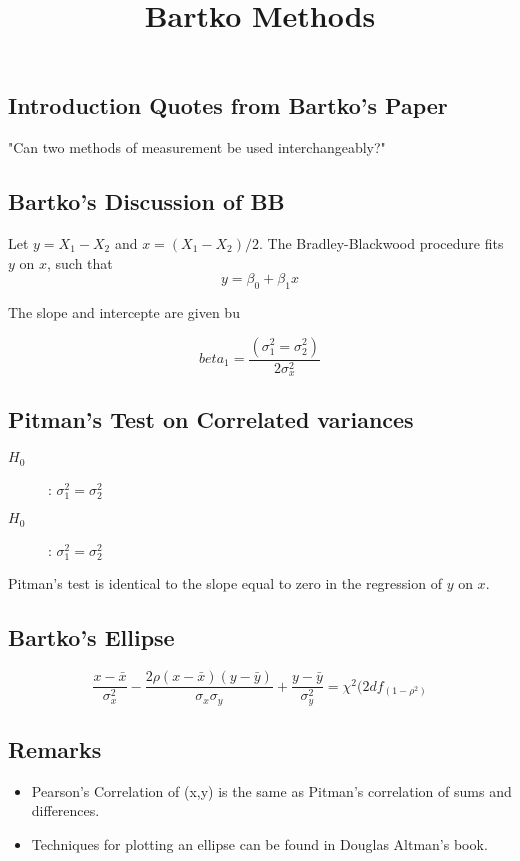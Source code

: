 

\title{Bartko Methods}
\subsection*{Introduction Quotes from Bartko's Paper}
"Can two methods of measurement be used interchangeably?"


\subsection*{Bartko's Discussion of BB}

Let $y = X_1 - X_2$ and $x= (X_1 - X_2)/2$.
The Bradley-Blackwood procedure fits $y$ on $x$, such that
\[ y = \beta_0 + \beta_1x \]

The slope and intercepte are given bu

\[beta_1 =  \frac{(\sigma^2_1 = \sigma^2_2)}{2\sigma^2_x}\]
\subsection*{Pitman's Test on Correlated variances}
\begin{description}
\item[$H_0$] : $\sigma^2_1 = \sigma^2_2$
\item[$H_0$] : $\sigma^2_1 = \sigma^2_2$
\end{description}


Pitman's test is identical to the slope equal to zero in the regression of $y$ on $x$.


\subsection*{Bartko's Ellipse}

\[ \frac{x - \bar{x}}{\sigma^2_x} - \frac{2\rho(x - \bar{x})(y - \bar{y})}{\sigma_x \sigma_y} + \frac{y - \bar{y}}{\sigma^2_y} = \chi^2(2df_(1-\rho^2) \]

\subsection*{Remarks}
\begin{itemize}
\item Pearson's Correlation of (x,y) is the same as Pitman's correlation of sums and differences.

\item Techniques for plotting an ellipse can be found in Douglas Altman's book.
\end{itemize}

